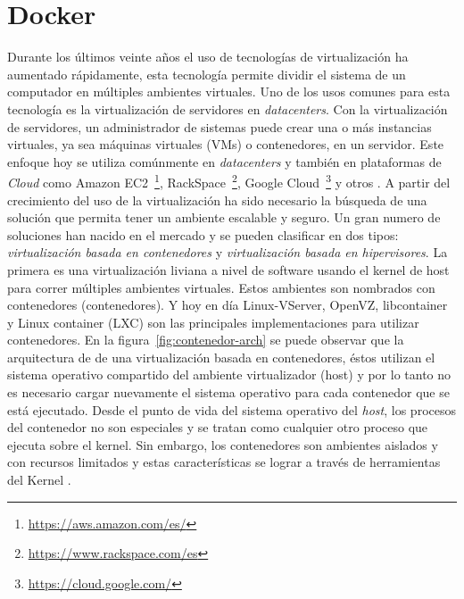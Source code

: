 \section{Docker}

Durante los últimos veinte años el uso de tecnologías de virtualización ha aumentado
	rápidamente, esta tecnología permite dividir el sistema de un computador
	en múltiples ambientes virtuales.
Uno de los usos comunes para esta tecnología es la virtualización de 
	servidores en \textit{datacenters}. Con la virtualización de servidores, un
	administrador de sistemas puede crear una o más instancias virtuales, ya sea
	máquinas virtuales (VMs) o contenedores, en un servidor.
Este enfoque hoy se utiliza comúnmente en \textit{datacenters} y también en plataformas de \textit{Cloud} como Amazon EC2~\footnote{\url{https://aws.amazon.com/es/}}, RackSpace~\footnote{\url{https://www.rackspace.com/es}}, Google Cloud~\footnote{\url{https://cloud.google.com/}} y otros \cite{felter2014updated}. 
A partir del crecimiento del uso de la virtualización ha sido necesario la búsqueda de una solución que permita tener un ambiente escalable y seguro. 
Un gran numero de soluciones han nacido en el mercado y se pueden clasificar en dos tipos: \textit{virtualización basada en contenedores} y \textit{virtualización basada en hipervisores}. 
La primera es una virtualización liviana a nivel de software usando el kernel de host para correr múltiples ambientes virtuales. Estos ambientes son nombrados con contenedores (contenedores).
Y hoy en día Linux-VServer, OpenVZ, libcontainer y Linux container (LXC) son
	las principales implementaciones para utilizar contenedores. En la
	figura~\ref{fig:contenedor-arch} se puede observar que la arquitectura de
	de una virtualización basada en contenedores, éstos utilizan el sistema	
	operativo compartido del ambiente virtualizador (host) y por lo tanto no es
	necesario cargar nuevamente el sistema operativo para cada contenedor que se está
	ejecutado.
Desde el punto de vida del sistema operativo del \textit{host}, los procesos del contenedor no son especiales y se tratan como cualquier otro proceso que ejecuta sobre el kernel.
Sin embargo, los contenedores son ambientes aislados y con recursos limitados y estas características se lograr a través de herramientas del Kernel \cite{merkel2014docker}.
	
